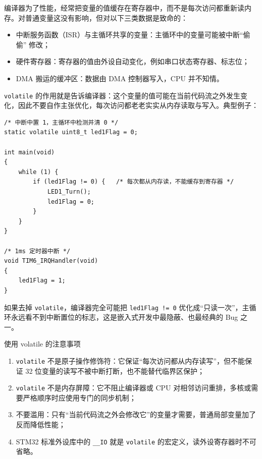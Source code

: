 编译器为了性能，经常把变量的值缓存在寄存器中，而不是每次访问都重新读内存。对普通变量这没有影响，但对以下三类数据是致命的：

\begin{itemize}
\item 中断服务函数（ISR）与主循环共享的变量：主循环中的变量可能被中断“偷偷” 修改；
\item 硬件寄存器：寄存器的值由外设自动变化，例如串口状态寄存器、标志位；
\item DMA 搬运的缓冲区：数据由 DMA 控制器写入，CPU 并不知情。
\end{itemize}

\texttt{volatile} 的作用就是告诉编译器：这个变量的值可能在当前代码流之外发生变化，因此不要自作主张优化，每次访问都老老实实从内存读取与写入。典型例子：

\begin{lstlisting}[style=c]
/* 中断中置 1，主循环中检测并清 0 */
static volatile uint8_t led1Flag = 0;

int main(void)
{
    while (1) {
        if (led1Flag != 0) {   /* 每次都从内存读，不能缓存到寄存器 */
            LED1_Turn();
            led1Flag = 0;
        }
    }
}

/* 1ms 定时器中断 */
void TIM6_IRQHandler(void)
{
    led1Flag = 1;
}
\end{lstlisting}

如果去掉 \texttt{volatile}，编译器完全可能把 \texttt{led1Flag != 0} 优化成“只读一次”，主循环永远看不到中断置位的标志，这是嵌入式开发中最隐蔽、也最经典的 Bug 之一。

\begin{anybox}{使用 volatile 的注意事项}

\begin{enumerate}
\item \texttt{volatile} 不是原子操作修饰符：它保证“每次访问都从内存读写”，但不能保证 32 位变量的读写不被中断打断，也不能替代临界区保护；
\item \texttt{volatile} 不是内存屏障：它不阻止编译器或 CPU 对相邻访问重排，多核或需要严格顺序时应使用专门的同步机制；
\item 不要滥用：只有“当前代码流之外会修改它”的变量才需要，普通局部变量加了反而降低性能；
\item STM32 标准外设库中的 \texttt{\_\_IO} 就是 \texttt{volatile} 的宏定义，读外设寄存器时不可省略。
\end{enumerate}

\end{anybox}
